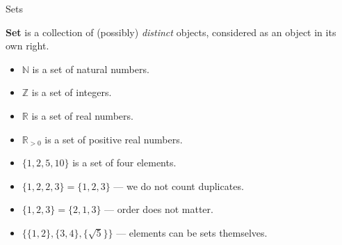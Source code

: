 \documentclass{zkdl-presentation-template}
\begin{document}
    \begin{frame}{Sets}
      \begin{definition}
        \textbf{Set} is a collection of (possibly) \textit{distinct} objects, considered as an object in its own right. \pause
      \end{definition}

      \begin{example}
        \begin{itemize}
          \item $\mathbb{N}$ is a set of natural numbers.
          \item $\mathbb{Z}$ is a set of integers.
          \item $\mathbb{R}$ is a set of real numbers.
          \item $\mathbb{R}_{>0}$ is a set of positive real numbers. \pause
          \item $\{1, 2, 5, 10\}$ is a set of four elements.
          \item $\{1, 2, 2, 3\} = \{1,2,3\}$ --- we do not count duplicates.\pause
          \item $\{1,2,3\} = \{2,1,3\}$ --- order does not matter.
          \item $\{\{1,2\},\{3,4\}, \{\sqrt{5}\}\}$ --- elements can be sets themselves.
        \end{itemize}
      \end{example}
    \end{frame}
\end{document}
